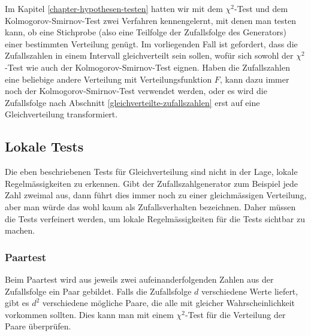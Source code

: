 Im Kapitel \ref{chapter-hypothesen-testen} hatten wir mit dem $\chi^2$-Test
und dem Kolmogorov-Smirnov-Test zwei Verfahren kennengelernt, mit denen
man testen kann, ob eine Stichprobe (also eine Teilfolge der Zufallsfolge
des Generators) einer bestimmten Verteilung genügt.
Im vorliegenden Fall
ist gefordert, dass die Zufallszahlen in einem Intervall gleichverteilt
sein sollen, wofür sich sowohl der $\chi^2$-Test wie auch der
Kolmogorov-Smirnov-Test eignen.
Haben die Zufallszahlen eine beliebige
andere Verteilung mit Verteilungsfunktion $F$, kann dazu immer noch
der Kolmogorov-Smirnov-Test verwendet werden, oder es wird die Zufallsfolge
nach Abschnitt \ref{gleichverteilte-zufallszahlen} erst auf eine
Gleichverteilung transformiert.

\subsection{Lokale Tests}
Die eben beschriebenen Tests für Gleichverteilung sind nicht in der
Lage, lokale Regelmässigkeiten zu erkennen.
Gibt der Zufallszahlgenerator
zum Beispiel jede Zahl zweimal aus, dann führt dies immer noch zu
einer gleichmässigen Verteilung, aber man würde das wohl kaum als
Zufallsverhalten bezeichnen.
Daher müssen die Tests verfeinert werden,
um lokale Regelmässigkeiten für die Tests sichtbar zu machen.

\subsubsection{Paartest}
Beim Paartest wird aus jeweils zwei aufeinanderfolgenden Zahlen aus der
Zufallsfolge ein Paar gebildet.
Falls die Zufallsfolge $d$ verschiedene
Werte liefert, gibt es $d^2$ verschiedene mögliche Paare, die alle
mit gleicher Wahrscheinlichkeit vorkommen sollten.
Dies kann man mit einem
$\chi^2$-Test für die Verteilung der Paare überprüfen.

